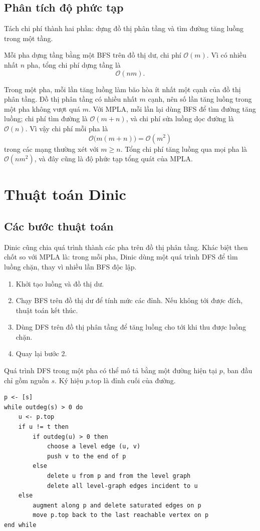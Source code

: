 \documentclass[11pt]{article}
\newcommand{\Oh}{\mathcal{O}}
\begin{document}
\subsection{Phân tích độ phức tạp}

Tách chi phí thành hai phần: dựng đồ thị phân tầng và tìm đường tăng luồng
trong một tầng.

Mỗi pha dựng tầng bằng một BFS trên đồ thị dư, chi phí \(\Oh(m)\). Vì có nhiều
nhất \(n\) pha, tổng chi phí dựng tầng là
\[
  \Oh(nm).
\]

Trong một pha, mỗi lần tăng luồng làm bão hòa ít nhất một cạnh của đồ thị
phân tầng. Đồ thị phân tầng có nhiều nhất \(m\) cạnh, nên số lần tăng luồng
trong một pha không vượt quá \(m\). Với MPLA, mỗi lần lại dùng BFS để tìm
đường tăng luồng; chi phí tìm đường là \(\Oh(m+n)\), và chi phí sửa luồng dọc
đường là \(\Oh(n)\). Vì vậy chi phí mỗi pha là
\[
  \Oh\bigl(m(m+n)\bigr)=\Oh(m^2)
\]
trong các mạng thường xét với \(m\ge n\). Tổng chi phí tăng luồng qua mọi pha
là \(\Oh(nm^2)\), và đây cũng là độ phức tạp tổng quát của MPLA.

\section{Thuật toán Dinic}

\subsection{Các bước thuật toán}

Dinic cũng chia quá trình thành các pha trên đồ thị phân tầng. Khác biệt then
chốt so với MPLA là: trong mỗi pha, Dinic dùng một quá trình DFS để tìm luồng
chặn, thay vì nhiều lần BFS độc lập.

\begin{enumerate}
  \item Khởi tạo luồng và đồ thị dư.
  \item Chạy BFS trên đồ thị dư để tính mức các đỉnh. Nếu không tới được đích,
  thuật toán kết thúc.
  \item Dùng DFS trên đồ thị phân tầng để tăng luồng cho tới khi thu được
  luồng chặn.
  \item Quay lại bước 2.
\end{enumerate}

Quá trình DFS trong một pha có thể mô tả bằng một đường hiện tại \(p\), ban
đầu chỉ gồm nguồn \(s\). Ký hiệu \(p.\mathrm{top}\) là đỉnh cuối của đường.

\begin{verbatim}
p <- [s]
while outdeg(s) > 0 do
    u <- p.top
    if u != t then
        if outdeg(u) > 0 then
            choose a level edge (u, v)
            push v to the end of p
        else
            delete u from p and from the level graph
            delete all level-graph edges incident to u
    else
        augment along p and delete saturated edges on p
        move p.top back to the last reachable vertex on p
end while
\end{verbatim}
\end{document}
